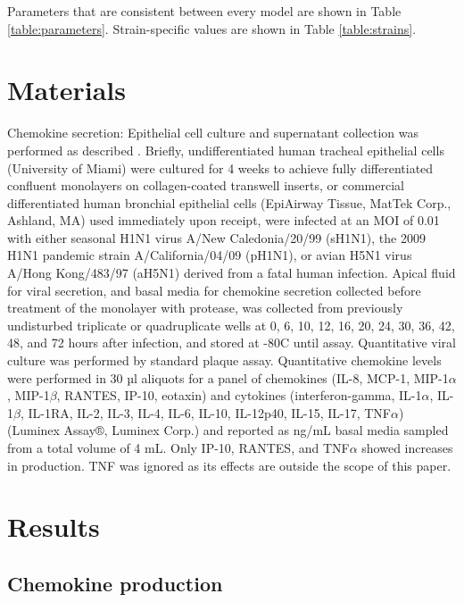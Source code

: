 \documentclass[10pt]{article}
\begin{document}
Parameters that are consistent between every model are shown in Table \ref{table:parameters}.  Strain-specific values are shown in Table \ref{table:strains}.

\section*{Materials}

Chemokine secretion:  Epithelial cell culture and supernatant collection was performed as described \cite{Mitchell2011}.  Briefly, undifferentiated human tracheal epithelial cells (University of Miami) were cultured for 4 weeks to achieve fully differentiated confluent monolayers on collagen-coated transwell inserts, or commercial differentiated human bronchial epithelial cells (EpiAirway Tissue, MatTek Corp., Ashland, MA) used immediately upon receipt, were infected at an MOI of 0.01 with either seasonal H1N1 virus A/New Caledonia/20/99 (sH1N1), the 2009 H1N1 pandemic strain A/California/04/09 (pH1N1), or avian H5N1 virus A/Hong Kong/483/97 (aH5N1) derived from a fatal human infection.  Apical fluid for viral secretion, and basal media for chemokine secretion collected before treatment of the monolayer with protease, was collected from previously undisturbed triplicate or quadruplicate wells at 0, 6, 10, 12, 16, 20, 24, 30, 36, 42, 48, and 72 hours after infection, and stored at -80C until assay.  Quantitative viral culture was performed by standard plaque assay.  Quantitative chemokine levels were performed in 30 µl aliquots for a panel of chemokines (IL-8, MCP-1, MIP-1$\alpha$, MIP-1$\beta$, RANTES, IP-10, eotaxin) and cytokines (interferon-gamma, IL-1$\alpha$, IL-1$\beta$, IL-1RA, IL-2, IL-3, IL-4, IL-6, IL-10, IL-12p40, IL-15, IL-17, TNF$\alpha$) (Luminex Assay®, Luminex Corp.) and reported as ng/mL basal media sampled from a total volume of 4 mL.  Only IP-10, RANTES, and TNF$\alpha$ showed increases in production.  TNF was ignored as its effects are outside the scope of this paper.


\section*{Results}

\subsection*{Chemokine production}
\end{document}
